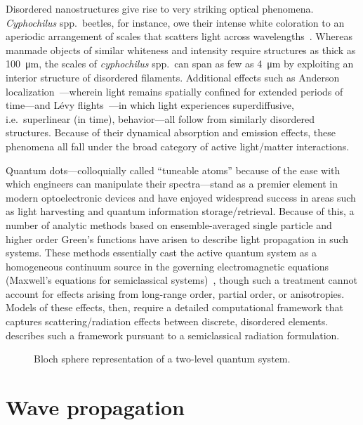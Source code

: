 Disordered nanostructures give rise to very striking optical phenomena.
\emph{Cyphochilus} spp.\ beetles, for instance, owe their intense white coloration to an aperiodic arrangement of scales that scatters light across wavelengths~\cite{Vukusic2007}.
Whereas manmade objects of similar whiteness and intensity require structures as thick as \SI{100}{\micro\meter}, the scales of \emph{cyphochilus} spp.\ can span as few as \SI{4}{\micro\meter} by exploiting an interior structure of disordered filaments. 
Additional effects such as Anderson localization~\cite{Anderson1985}---wherein light remains spatially confined for extended periods of time---and L\'evy flights~\cite{Barthelemy2008}---in which light experiences superdiffusive, i.e.\ superlinear (in time), behavior---all follow from similarly disordered structures.
Because of their dynamical absorption and emission effects, these phenomena all fall under the broad category of active light/matter interactions.

Quantum dots---colloquially called ``tuneable atoms'' because of the ease with which engineers can manipulate their spectra---stand as a premier element in modern optoelectronic devices and have enjoyed widespread success in areas such as light harvesting and quantum information storage/retrieval. 
Because of this, a number of analytic methods based on ensemble-averaged single particle and higher order Green's functions have arisen to describe light propagation in such systems.
These methods essentially cast the active quantum system as a homogeneous continuum source in the governing electromagnetic equations (Maxwell's equations for semiclassical systems)~\cite{Arecchi1965}, though such a treatment cannot account for effects arising from long-range order, partial order, or anisotropies. 
Models of these effects, then, require a detailed computational framework that captures scattering/radiation effects between discrete, disordered elements.
 describes such a framework pursuant to a semiclassical radiation formulation.

\begin{figure}
  \centering
  \caption{\label{eq:fig}Bloch sphere representation of a two-level quantum system.}
\end{figure}


\section{Wave propagation}

